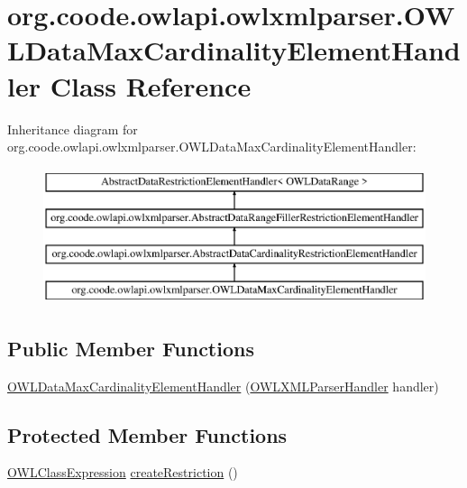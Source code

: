 \hypertarget{classorg_1_1coode_1_1owlapi_1_1owlxmlparser_1_1_o_w_l_data_max_cardinality_element_handler}{\section{org.\-coode.\-owlapi.\-owlxmlparser.\-O\-W\-L\-Data\-Max\-Cardinality\-Element\-Handler Class Reference}
\label{classorg_1_1coode_1_1owlapi_1_1owlxmlparser_1_1_o_w_l_data_max_cardinality_element_handler}
}
Inheritance diagram for org.\-coode.\-owlapi.\-owlxmlparser.\-O\-W\-L\-Data\-Max\-Cardinality\-Element\-Handler\-:\begin{figure}[H]
\begin{center}
\leavevmode
\includegraphics[height=4.000000cm]{classorg_1_1coode_1_1owlapi_1_1owlxmlparser_1_1_o_w_l_data_max_cardinality_element_handler}
\end{center}
\end{figure}
\subsection*{Public Member Functions}
\begin{DoxyCompactItemize}
\item 
\hyperlink{classorg_1_1coode_1_1owlapi_1_1owlxmlparser_1_1_o_w_l_data_max_cardinality_element_handler_af6c7782de6ad79a76c0bd89af9499158}{O\-W\-L\-Data\-Max\-Cardinality\-Element\-Handler} (\hyperlink{classorg_1_1coode_1_1owlapi_1_1owlxmlparser_1_1_o_w_l_x_m_l_parser_handler}{O\-W\-L\-X\-M\-L\-Parser\-Handler} handler)
\end{DoxyCompactItemize}
\subsection*{Protected Member Functions}
\begin{DoxyCompactItemize}
\item 
\hyperlink{interfaceorg_1_1semanticweb_1_1owlapi_1_1model_1_1_o_w_l_class_expression}{O\-W\-L\-Class\-Expression} \hyperlink{classorg_1_1coode_1_1owlapi_1_1owlxmlparser_1_1_o_w_l_data_max_cardinality_element_handler_a3053489b38b0fb60fb4dd08d83696e67}{create\-Restriction} ()
\end{DoxyCompactItemize}



